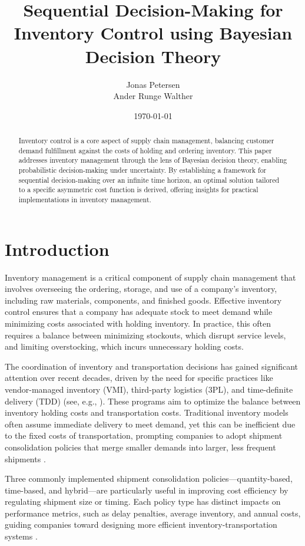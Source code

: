 \documentclass[a4paper,12pt]{article}
\title{Sequential Decision-Making for Inventory Control using Bayesian Decision Theory}
\author{Jonas Petersen \\ Ander Runge Walther }
\date{\today}
\begin{document}
	\maketitle
	
	\begin{abstract}
		Inventory control is a core aspect of supply chain management, balancing customer demand fulfillment against the costs of holding and ordering inventory. This paper addresses inventory management through the lens of Bayesian decision theory, enabling probabilistic decision-making under uncertainty. By establishing a framework for sequential decision-making over an infinite time horizon, an optimal solution tailored to a specific asymmetric cost function is derived, offering insights for practical implementations in inventory management.
	\end{abstract}
	
	\section{Introduction}
	Inventory management is a critical component of supply chain management that involves overseeing the ordering, storage, and use of a company's inventory, including raw materials, components, and finished goods. Effective inventory control ensures that a company has adequate stock to meet demand while minimizing costs associated with holding inventory. In practice, this often requires a balance between minimizing stockouts, which disrupt service levels, and limiting overstocking, which incurs unnecessary holding costs.
	
	The coordination of inventory and transportation decisions has gained significant attention over recent decades, driven by the need for specific practices like vendor-managed inventory (VMI), third-party logistics (3PL), and time-definite delivery (TDD) (see, e.g., \citep{CetinkayaLee2000, Alumur2012, Gurler2014}). These programs aim to optimize the balance between inventory holding costs and transportation costs. Traditional inventory models often assume immediate delivery to meet demand, yet this can be inefficient due to the fixed costs of transportation, prompting companies to adopt shipment consolidation policies that merge smaller demands into larger, less frequent shipments \citep{CetinkayaBookbinder2003, HigginsonBookbinder1994}.
	
	Three commonly implemented shipment consolidation policies—quantity-based, time-based, and hybrid—are particularly useful in improving cost efficiency by regulating shipment size or timing. Each policy type has distinct impacts on performance metrics, such as delay penalties, average inventory, and annual costs, guiding companies toward designing more efficient inventory-transportation systems \citep{Cetinkaya2005, Wei2020, Cetinkaya2006}.
	
\end{document}
